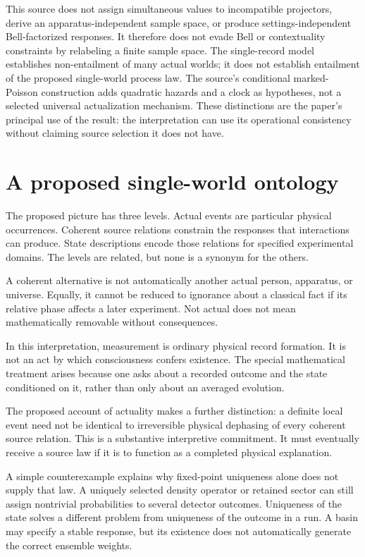 \documentclass[11pt,a4paper]{article}
\begin{document}
This source does not assign simultaneous values to incompatible projectors,
derive an apparatus-independent sample space, or produce settings-independent
Bell-factorized responses. It therefore does not evade Bell or contextuality
constraints by relabeling a finite sample space. The single-record model
establishes non-entailment of many actual worlds; it does not establish
entailment of the proposed single-world process law. The source's conditional
marked-Poisson construction adds quadratic hazards and a clock as hypotheses,
not a selected universal actualization mechanism. These distinctions are
the paper's principal use of the result: the interpretation can use its
operational consistency without claiming source selection it does not have.

\section{A proposed single-world ontology}
\label{sec:ontology}
The proposed picture has three levels. Actual events are particular physical occurrences. Coherent source relations constrain the responses that interactions can produce. State descriptions encode those relations for specified experimental domains. The levels are related, but none is a synonym for the others.

A coherent alternative is not automatically another actual person, apparatus, or universe. Equally, it cannot be reduced to ignorance about a classical fact if its relative phase affects a later experiment. Not actual does not mean mathematically removable without consequences.

In this interpretation, measurement is ordinary physical record formation. It is not an act by which consciousness confers existence. The special mathematical treatment arises because one asks about a recorded outcome and the state conditioned on it, rather than only about an averaged evolution.

The proposed account of actuality makes a further distinction: a definite local event need not be identical to irreversible physical dephasing of every coherent source relation. This is a substantive interpretive commitment. It must eventually receive a source law if it is to function as a completed physical explanation.

A simple counterexample explains why fixed-point uniqueness alone does not supply that law. A uniquely selected density operator or retained sector can still assign nontrivial probabilities to several detector outcomes. Uniqueness of the state solves a different problem from uniqueness of the outcome in a run. A basin may specify a stable response, but its existence does not automatically generate the correct ensemble weights.
\end{document}
